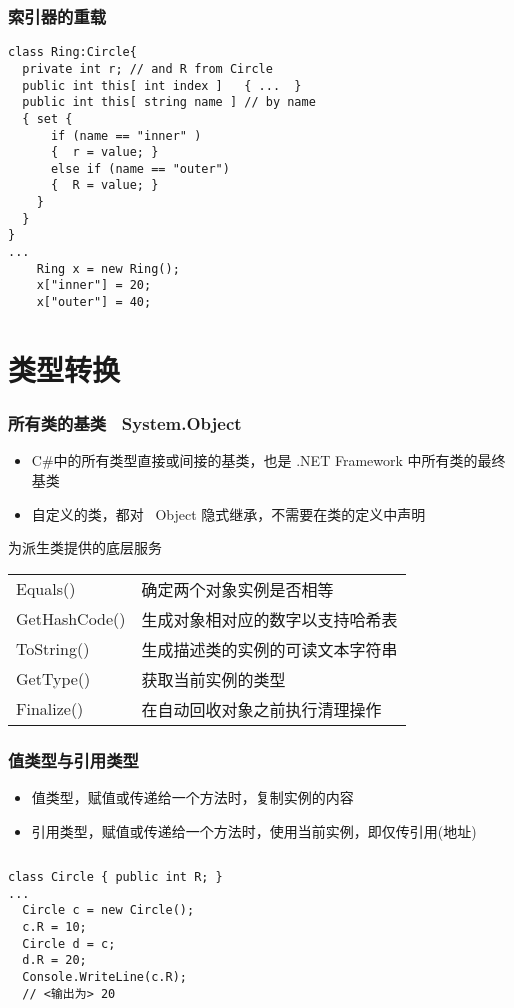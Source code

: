\begin{frame}[fragile]
\frametitle{索引器的重载}
\begin{lstlisting}
class Ring:Circle{
  private int r; // and R from Circle
  public int this[ int index ]   { ...  }
  public int this[ string name ] // by name
  { set {
      if (name == "inner" )
      {  r = value; }
      else if (name == "outer")
      {  R = value; }
    }
  }
}
...
    Ring x = new Ring();
    x["inner"] = 20;
    x["outer"] = 40;
\end{lstlisting}


\end{frame}

\section{类型转换}

\begin{frame}
\frametitle{所有类的基类 ~System.Object}
\begin{itemize}
\item C\#中的所有类型直接或间接的基类，也是 .NET Framework 中所有类的最终基类
\item 自定义的类，都对 ~Object 隐式继承，不需要在类的定义中声明
\end{itemize}
\pause
\begin{block}{为派生类提供的底层服务}
  \begin{tabular}{l|l}
    Equals()      & 确定两个对象实例是否相等         \\
    GetHashCode() & 生成对象相对应的数字以支持哈希表 \\
    ToString()    & 生成描述类的实例的可读文本字符串 \\
    GetType()     & 获取当前实例的类型               \\
    Finalize()    & 在自动回收对象之前执行清理操作   \\
  \end{tabular}
  \normalfont
\end{block}
\end{frame}


\begin{frame}[fragile]
\frametitle{值类型与引用类型}
\begin{itemize}
\item 值类型，赋值或传递给一个方法时，复制实例的内容
\item 引用类型，赋值或传递给一个方法时，使用当前实例，即仅传引用(地址)
\end{itemize}
\begin{columns}
\begin{lstlisting}[escapeinside=<>]
class Circle { public int R; }
...
  Circle c = new Circle();
  c.R = 10;
  Circle d = c;
  d.R = 20;
  Console.WriteLine(c.R);
  // <输出为> 20
\end{lstlisting}
\begin{figure}
  \centering
  
\end{figure}
\end{columns}
\end{frame}

